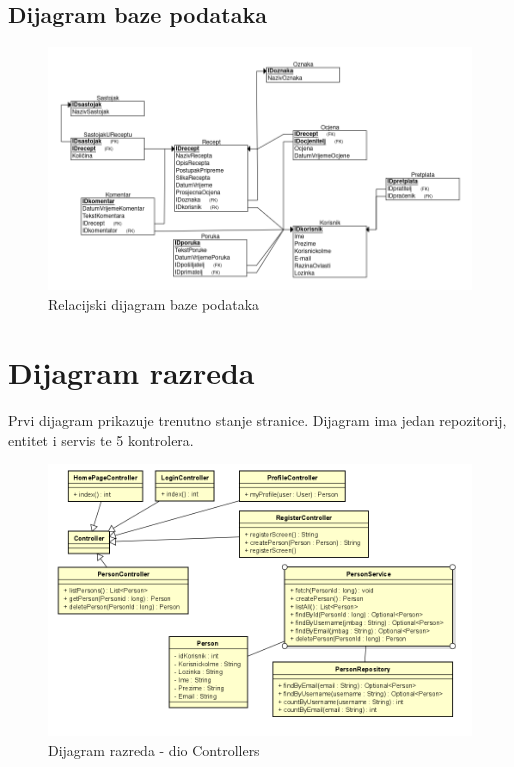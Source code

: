 			 \subsection{Dijagram baze podataka}
			 \begin{figure}[H]
				 \includegraphics[scale=0.50]{slike/dijagram_baze_v2.png} %
				 \centering
				 \caption{Relacijski dijagram baze podataka}
				 \label{fig:Relacijski dijagram baze podataka}
			 \end{figure}
		 
			 \eject
			
			
		\section{Dijagram razreda}

		Prvi dijagram prikazuje trenutno stanje stranice. Dijagram ima jedan repozitorij, entitet i servis te 5 kontrolera.
		\begin{figure}[H]
			\includegraphics[scale=0.75]{slike/dijagram_razreda2.png} %
			\centering
			\caption{Dijagram razreda - dio Controllers}
			\label{fig:Dijagram_razreda2}
		\end{figure}


